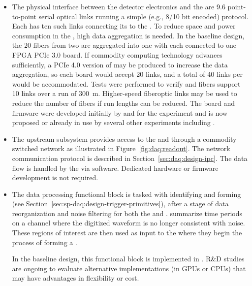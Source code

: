 \begin{itemize}
  
  \item The physical interface between the detector electronics and the  are \SI{9.6}{\Gbps}
point-to-point serial optical links running a simple (e.g., 8/10 bit encoded) protocol.  Each
 has ten such links connecting its  to the . To reduce space and
power consumption in the , high data aggregation is needed. In the baseline design, the
\num{20} fibers from two  are aggregated into one  with each  connected
to one  FPGA PCIe 3.0 board.  If commodity computing technology advances sufficiently, a PCIe 4.0 version of
 may be produced to increase the data aggregation, so each board would accept \num{20}
links, and a total of \num{40} links per  would be accommodated. Tests were performed to verify
 and  fibers support \SI{10}{\Gbps} links over a run of \SI{300}{\meter}.
Higher-speed fiberoptic links may be used to reduce the number of fibers if run
lengths can be reduced. The  board and firmware were developed initially by and for the
 experiment and is now proposed or already in use by several other experiments including
.
  
  \item The upstream  subsystem provides access to the
 and  through a commodity switched network as
illustrated in Figure~\ref{fig:daq:readout}. The network communication
protocol is described in Section~\ref{sec:daq:design-ipc}. The data flow
is handled by the  via software. Dedicated hardware or firmware
development is not required.

\item The data processing functional block is tasked with identifying and forming  (see
Section~\ref{sec:sp-daq:design-trigger-primitives}), after a stage of data
reorganization and noise filtering for both the  and .  summarize time periods on a channel where the digitized waveform is no longer consistent with noise.
These regions of interest are then used as input to the  where they begin the process of forming a .

In the baseline design, this functional block is implemented in .
R\&D studies are ongoing to evaluate alternative implementations (in GPUs or CPUs) that may have advantages in flexibility or cost.


\end{itemize}

